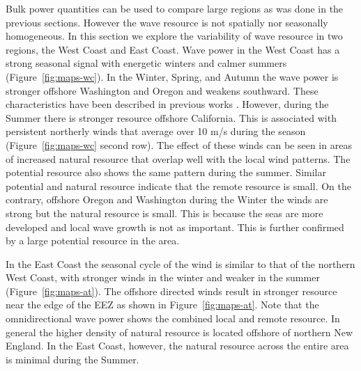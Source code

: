 Bulk power quantities can be used to compare large regions as was done in the previous sections. However the wave resource is not spatially nor seasonally homogeneous. In this section we explore the variability of wave resource in two regions, the West Coast and East Coast. Wave power in the West Coast has a strong seasonal signal with energetic winters and calmer summers (Figure~\ref{fig:maps-wc}). In the Winter, Spring, and Autumn the wave power is stronger offshore Washington and Oregon and weakens southward. These characteristics have been described in previous works \citep[e.g.][]{garcia-medinaWaveResourceAssessment2014,lenee-bluhm_characterizing_2011,yangCharacteristicsVariabilityNearshore2020}. However, during the Summer there is stronger resource offshore California. This is associated with persistent northerly winds that average over 10 m/s during the season (Figure~\ref{fig:maps-wc} second row). The effect of these winds can be seen in areas of increased natural resource that overlap well with the local wind patterns. The potential resource also shows the same pattern during the summer. Similar potential and natural resource indicate that the remote resource is small. On the contrary, offshore Oregon and Washington during the Winter the winds are strong but the natural resource is small. This is because the seas are more developed and local wave growth is not as important. This is further confirmed by a large potential resource in the area. 


In the East Coast the seasonal cycle of the wind is similar to that of the northern West Coast, with stronger winds in the winter and weaker in the summer (Figure~\ref{fig:maps-at}). The offshore directed winds result in stronger resource near the edge of the EEZ as shown in Figure~\ref{fig:maps-at}. Note that the omnidirectional wave power shows the combined local and remote resource. In general the higher density of natural resource is located offshore of northern New England. In the East Coast, however, the natural resource across the entire area is minimal during the Summer.

